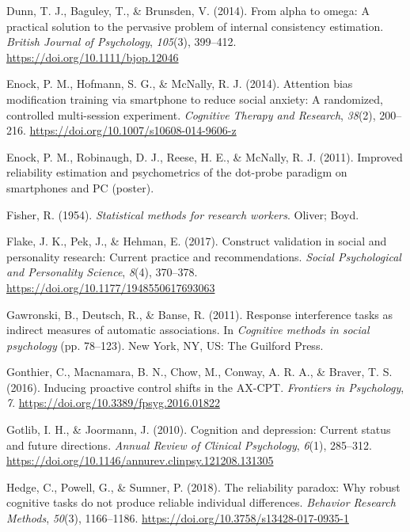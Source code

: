 \documentclass[english,,man,floatsintext]{apa6}
\begin{document}
\leavevmode\hypertarget{ref-dunn_alpha_2014}{}%
Dunn, T. J., Baguley, T., \& Brunsden, V. (2014). From alpha to omega: A practical solution to the pervasive problem of internal consistency estimation. \emph{British Journal of Psychology}, \emph{105}(3), 399--412. \url{https://doi.org/10.1111/bjop.12046}

\leavevmode\hypertarget{ref-enock_attention_2014}{}%
Enock, P. M., Hofmann, S. G., \& McNally, R. J. (2014). Attention bias modification training via smartphone to reduce social anxiety: A randomized, controlled multi-session experiment. \emph{Cognitive Therapy and Research}, \emph{38}(2), 200--216. \url{https://doi.org/10.1007/s10608-014-9606-z}

\leavevmode\hypertarget{ref-enock_improved_2011}{}%
Enock, P. M., Robinaugh, D. J., Reese, H. E., \& McNally, R. J. (2011). Improved reliability estimation and psychometrics of the dot-probe paradigm on smartphones and PC (poster).

\leavevmode\hypertarget{ref-fisher_statistical_1954}{}%
Fisher, R. (1954). \emph{Statistical methods for research workers}. Oliver; Boyd.

\leavevmode\hypertarget{ref-flake_construct_2017}{}%
Flake, J. K., Pek, J., \& Hehman, E. (2017). Construct validation in social and personality research: Current practice and recommendations. \emph{Social Psychological and Personality Science}, \emph{8}(4), 370--378. \url{https://doi.org/10.1177/1948550617693063}

\leavevmode\hypertarget{ref-gawronski_response_2011}{}%
Gawronski, B., Deutsch, R., \& Banse, R. (2011). Response interference tasks as indirect measures of automatic associations. In \emph{Cognitive methods in social psychology} (pp. 78--123). New York, NY, US: The Guilford Press.

\leavevmode\hypertarget{ref-gonthier_inducing_2016}{}%
Gonthier, C., Macnamara, B. N., Chow, M., Conway, A. R. A., \& Braver, T. S. (2016). Inducing proactive control shifts in the AX-CPT. \emph{Frontiers in Psychology}, \emph{7}. \url{https://doi.org/10.3389/fpsyg.2016.01822}

\leavevmode\hypertarget{ref-gotlib_cognition_2010}{}%
Gotlib, I. H., \& Joormann, J. (2010). Cognition and depression: Current status and future directions. \emph{Annual Review of Clinical Psychology}, \emph{6}(1), 285--312. \url{https://doi.org/10.1146/annurev.clinpsy.121208.131305}

\leavevmode\hypertarget{ref-hedge_reliability_2018}{}%
Hedge, C., Powell, G., \& Sumner, P. (2018). The reliability paradox: Why robust cognitive tasks do not produce reliable individual differences. \emph{Behavior Research Methods}, \emph{50}(3), 1166--1186. \url{https://doi.org/10.3758/s13428-017-0935-1}
\end{document}
